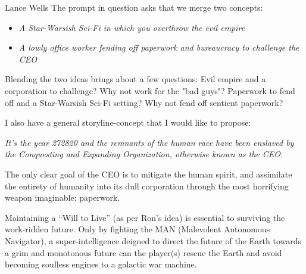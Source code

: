 \documentclass[12pt]{report}
\begin{document}
\begin{section}{Lance Wells}
The prompt in question asks that we merge two concepts:
\begin{itemize}
\item \emph{A Star-Warsish Sci-Fi in which you overthrow the evil empire}
\item \emph{A lowly office worker fending off paperwork and bureaucracy to challenge the CEO}
\end{itemize}

Blending the two ideas brings about a few questions:
Evil empire and a corporation to challenge? Why not work for the "bad guys"?
Paperwork to fend off and a Star-Warsish Sci-Fi setting? Why not fend off 
sentient paperwork?

I also have a general storyline-concept that I would like to propose:

\begin{center}
\emph{It's the year 272820 and the remnants of the human race have been
enslaved by the Conquesting and Expanding Organization, otherwise known as
the CEO.}
\end{center}

The only clear goal of the CEO is to mitigate the human spirit, and
assimilate the entirety of humanity into its dull corporation through the
most horrifying weapon imaginable: paperwork.

Maintaining a ``Will to Live'' (as per Ron's idea) is essential to surviving
the work-ridden future. Only by fighting the MAN (Malevolent Autonomous
Navigator), a super-intelligence deigned to direct the future of the Earth
towards a grim and monotonous future can the player(s) rescue the Earth and
avoid becoming soulless engines to a galactic war machine.
\end{section}
\end{document}

